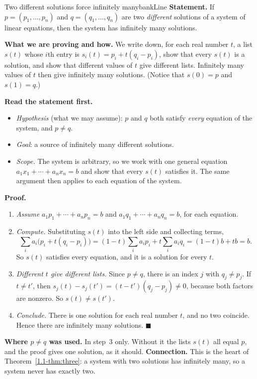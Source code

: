 \documentclass[11pt]{article}
\begin{document}
\begin{exmp}{Two different solutions force infinitely many}{bankLine}
\textbf{Statement.} If $p=(p_1,\dots,p_n)$ and $q=(q_1,\dots,q_n)$ are two \emph{different} solutions of a system of linear equations, then the system has infinitely many solutions.

\textbf{What we are proving and how.} We write down, for each real number $t$, a list $s(t)$ whose $i$th entry is $s_i(t)=p_i+t(q_i-p_i)$, show that every $s(t)$ is a solution, and show that different values of $t$ give different lists. Infinitely many values of $t$ then give infinitely many solutions. (Notice that $s(0)=p$ and $s(1)=q$.)

\textbf{Read the statement first.}
\begin{itemize}
  \item \emph{Hypothesis} (what we may assume): $p$ and $q$ both satisfy \emph{every} equation of the system, and $p\neq q$.
  \item \emph{Goal}: a source of infinitely many different solutions.
  \item \emph{Scope.} The system is arbitrary, so we work with one general equation $a_1x_1+\cdots+a_nx_n=b$ and show that every $s(t)$ satisfies it. The same argument then applies to each equation of the system.
\end{itemize}

\textbf{Proof.}
\begin{enumerate}[itemsep=2pt]
  \item \emph{Assume} $a_1p_1+\cdots+a_np_n=b$ and $a_1q_1+\cdots+a_nq_n=b$, for each equation.
  \item \emph{Compute.} Substituting $s(t)$ into the left side and collecting terms,
  \[
  \sum_i a_i\bigl(p_i+t(q_i-p_i)\bigr)=(1-t)\sum_i a_ip_i+t\sum_i a_iq_i=(1-t)b+tb=b.
  \]
  So $s(t)$ satisfies every equation, and it is a solution for every $t$.
  \item \emph{Different $t$ give different lists.} Since $p\neq q$, there is an index $j$ with $q_j\neq p_j$. If $t\neq t'$, then $s_j(t)-s_j(t')=(t-t')(q_j-p_j)\neq0$, because both factors are nonzero. So $s(t)\neq s(t')$.
  \item \emph{Conclude.} There is one solution for each real number $t$, and no two coincide. Hence there are infinitely many solutions. \qquad$\blacksquare$
\end{enumerate}
\textbf{Where $p\neq q$ was used.} In step~3 only. Without it the lists $s(t)$ all equal $p$, and the proof gives one solution, as it should. \textbf{Connection.} This is the heart of Theorem~\ref{1.1-thm:three}: a system with two solutions has infinitely many, so a system never has exactly two.
\end{exmp}
\end{document}
